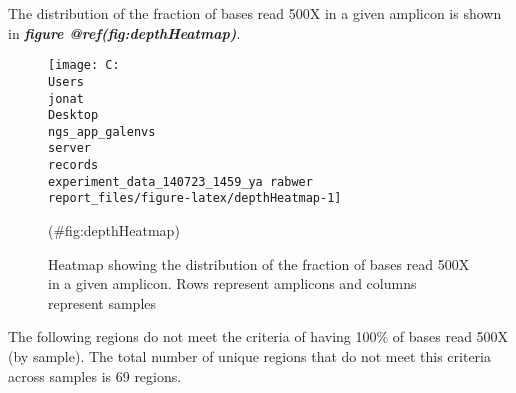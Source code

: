 \documentclass[
]{article}
\begin{document}
The distribution of the fraction of bases read 500X in a given amplicon is shown in \textbf{\emph{figure @ref(fig:depthHeatmap)}}.

\begin{figure}
\texttt{[image: C:\\Users\\jonat\\Desktop\\ngs\_app\_galenvs\\server\\records\\experiment\_data\_140723\_1459\_ya rabwer\\report\_files/figure-latex/depthHeatmap-1]} \caption[Depth 500X Heatmap]{Heatmap showing the distribution of the fraction of bases read 500X in a given amplicon. Rows represent amplicons and columns represent samples}(\#fig:depthHeatmap)
\end{figure}

The following regions do not meet the criteria of having 100\% of bases read 500X (by sample). The total number of unique regions that do not meet this criteria across samples is 69 regions.
\end{document}
